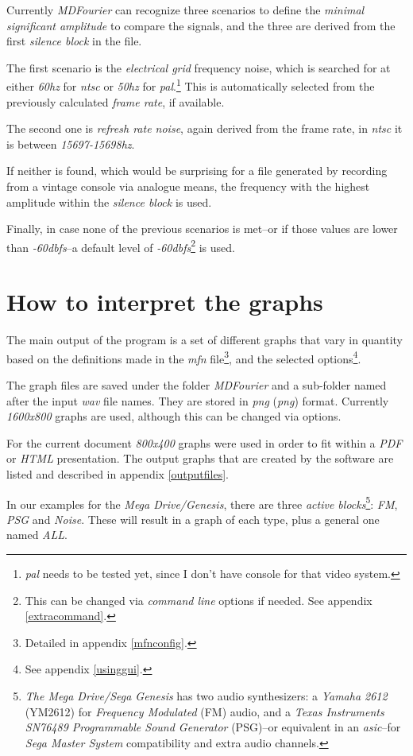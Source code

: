 \documentclass[10pt,a4paper]{report}
\newcommand{\define}[1]{\textit{\acrlong{#1}} (\textit{\acrshort{#1}})}
\newcommand{\ac}[1]{\textit{\acrshort{#1}}}
\newcommand{\hz}[1]{\textit{#1\acrshort{hz}}}
\newcommand{\db}[1]{\textit{#1\acrshort{dbfs}}}
\begin{document}
Currently \textit{MDFourier} can recognize three scenarios to define the \textit{minimal significant amplitude} to compare the signals, and the three are derived from the first \textit{silence block} in the file.

The first scenario is the \textit{electrical grid} frequency noise, which is searched for at either \hz{60} for \ac{ntsc} or \hz{50} for \ac{pal}.\footnote{\ac{pal} needs to be tested yet, since I don't have console for that video system.} This is automatically selected from the previously calculated \textit{frame rate}, if available.

The second one is \textit{refresh rate noise}, again derived from the frame rate, in \ac{ntsc} it is between \hz{15697-15698}. 

If neither is found, which would be surprising for a file generated by recording from a vintage console via analogue means, the frequency with the highest amplitude within the \textit{silence block} is used. 

Finally, in case none of the previous scenarios is met--or if those values are lower than \db{-60}--a default level of \db{-60}\footnote{This can be changed via \textit{command line} options if needed. See appendix \ref{extracommand}.} is used. 

\chapter{How to interpret the graphs}
\label{howtographs}

The main output of the program is a set of different graphs that vary in quantity based on the definitions made in the \textit{mfn} file\footnote{Detailed in appendix \ref{mfnconfig}.}, and the selected options\footnote{See appendix \ref{usinggui}.}.

The graph files are saved under the folder \textit{MDFourier} and a sub-folder named after the input \ac{wav} file names. They are stored in \define{png} format. Currently \textit{1600x800} graphs are used, although this can be changed via options. 

For the current document \textit{800x400} graphs were used in order to fit within a \textit{PDF} or \textit{HTML} presentation. The output graphs that are created by the software are listed and described in appendix \ref{outputfiles}.

In our examples for the \textit{Mega Drive/Genesis}, there are three \textit{active blocks}\footnote{\textit{The Mega Drive/Sega Genesis} has two audio synthesizers: a \textit{Yamaha 2612} (YM2612) for \textit{Frequency Modulated} (FM) audio, and a \textit{Texas Instruments SN76489 Programmable Sound Generator} (PSG)--or equivalent in an \ac{asic}--for \textit{Sega Master System} compatibility and extra audio channels.}: \textit{FM}, \textit{PSG} and \textit{Noise}. These will result in a graph of each type, plus a general one named \textit{ALL}.
\end{document}

